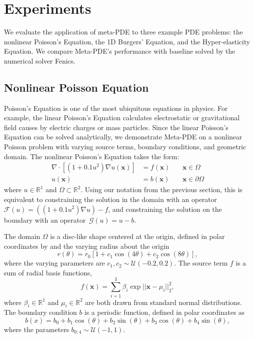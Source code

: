 \section{Experiments}
We evaluate the application of meta-PDE to three example PDE problems: the nonlinear Poisson's Equation, the 1D Burgers’ Equation, and the Hyper-elasticity Equation. We compare Meta-PDE's performance with baseline solved by the numerical solver Fenics.
\subsection{Nonlinear Poisson Equation}
Poisson's Equation is one of the most ubiquitous equations in physics. For example, the linear Poisson's Equation calculates electrostatic or gravitational field causes by electric charges or mass particles. Since the linear Poisson's Equation can be solved analytically, we demonstrate Meta-PDE on a nonlinear Poisson problem with varying source terms, boundary conditions, and geometric domain. The nonlinear Poisson's Equation takes the form:
\begin{align*}
\nabla \cdot \left[ (1 + 0.1 u^2) \nabla u(\bm{x}) \right]&= f(\bm{x}) \quad &\bm{x} \in \Omega\\
u(\bm{x}) &= b(\bm{x}) \quad &\bm{x} \in \partial\Omega
\end{align*}
where $u \in \mathbb{R}^1$ and $\Omega \subset \mathbb{R}^2$. Using our notation from the previous section, this is equivalent to constraining the solution in the domain with an operator~${\mathcal{F}(u) = ((1 + 0.1 u^2) \nabla u) - f}$, and constraining the solution on the boundary with an operator~${\mathcal{G}(u) = u - b}$.

The domain $\Omega$ is a disc-like shape centered at the origin, defined in polar coordinates by  and the varying radius about the origin
\[
r(\theta) = r_0[1 + c_1 \cos(4\theta) + c_2 \cos(8\theta)],
\]
where the varying parameters are $c_1, c_2 \sim \mathcal{U}(-0.2, 0.2)$. The source term $f$ is a sum of radial basis functions,
\[
f(\bm{x}) = \sum_{i=1}^3 \beta_i \exp{||\bm{x} - \mu_i||_2^2},
\]
where $\beta_i \in \mathbb{R}^1$ and $\mu_i \in \mathbb{R}^2$ are both drawn from standard normal distributions. The boundary condition $b$ is a periodic function, defined in polar coordinates as
\[
b(x) = b_0 + b_1 \cos(\theta) + b_2 \sin(\theta) + b_3 \cos(\theta) + b_4 \sin(\theta),
\]
where the parameters $b_{0:4} \sim \mathcal{U}(-1, 1)$.

